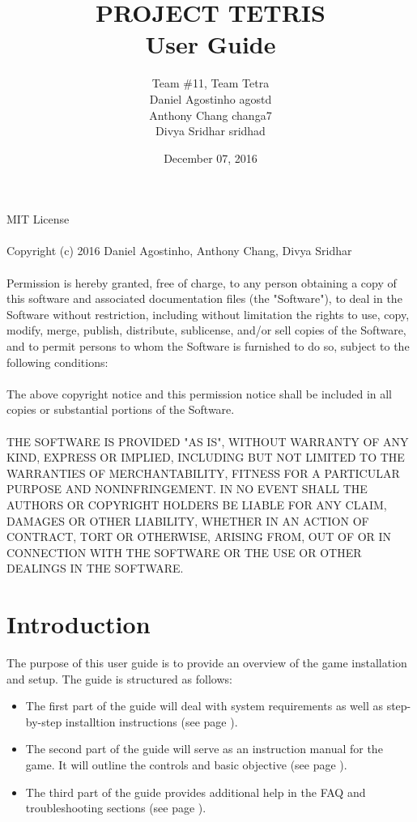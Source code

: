 \documentclass[12pt, titlepage]{article}
\title{PROJECT TETRIS\\User Guide}
\author{Team \#11, Team Tetra
		\\ Daniel Agostinho agostd
		\\ Anthony Chang changa7
		\\ Divya Sridhar sridhad
}
\date{December 07, 2016}
\begin{document}
\maketitle

\newpage
\noindent
MIT License\\
\noindent
\\Copyright (c) 2016 Daniel Agostinho, Anthony Chang, Divya Sridhar\\
\noindent
\\Permission is hereby granted, free of charge, to any person obtaining a copy
of this software and associated documentation files (the "Software"), to deal
in the Software without restriction, including without limitation the rights
to use, copy, modify, merge, publish, distribute, sublicense, and/or sell
copies of the Software, and to permit persons to whom the Software is
furnished to do so, subject to the following conditions:\\
\noindent
\\The above copyright notice and this permission notice shall be included in all
copies or substantial portions of the Software.\\
\noindent
\\THE SOFTWARE IS PROVIDED "AS IS", WITHOUT WARRANTY OF ANY KIND, EXPRESS OR
IMPLIED, INCLUDING BUT NOT LIMITED TO THE WARRANTIES OF MERCHANTABILITY,
FITNESS FOR A PARTICULAR PURPOSE AND NONINFRINGEMENT. IN NO EVENT SHALL THE
AUTHORS OR COPYRIGHT HOLDERS BE LIABLE FOR ANY CLAIM, DAMAGES OR OTHER
LIABILITY, WHETHER IN AN ACTION OF CONTRACT, TORT OR OTHERWISE, ARISING FROM,
OUT OF OR IN CONNECTION WITH THE SOFTWARE OR THE USE OR OTHER DEALINGS IN THE
SOFTWARE.
\newpage

\tableofcontents
\listoftables

\newpage
\section{Introduction}
The purpose of this user guide is to provide an overview of the game installation and setup. The guide is structured as follows:
\begin{itemize}
  \item The first part of the guide will deal with system requirements as well as step-by-step installtion instructions (see page ).
  \item The second part of the guide will serve as an instruction manual for the game. It will outline the controls and basic objective (see page ).
  \item The third part of the guide provides additional help in the FAQ and troubleshooting sections (see page ).
\end{itemize}
\end{document}
